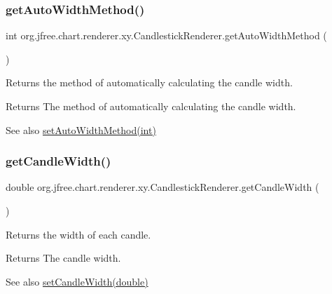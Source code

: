 \subsubsection{\texorpdfstring{get\+Auto\+Width\+Method()}{getAutoWidthMethod()}}
{\footnotesize\ttfamily int org.\+jfree.\+chart.\+renderer.\+xy.\+Candlestick\+Renderer.\+get\+Auto\+Width\+Method (\begin{DoxyParamCaption}{ }\end{DoxyParamCaption})}

Returns the method of automatically calculating the candle width.

\begin{DoxyReturn}{Returns}
The method of automatically calculating the candle width.
\end{DoxyReturn}
\begin{DoxySeeAlso}{See also}
\mbox{\hyperlink{classorg_1_1jfree_1_1chart_1_1renderer_1_1xy_1_1_candlestick_renderer_a556f4cc791dcf82be3e4e82c6f82dd66}{set\+Auto\+Width\+Method(int)}} 
\end{DoxySeeAlso}
\mbox{\label{classorg_1_1jfree_1_1chart_1_1renderer_1_1xy_1_1_candlestick_renderer_a8e2e6f4753add10d08fb407e21de08cf}} 
\subsubsection{\texorpdfstring{get\+Candle\+Width()}{getCandleWidth()}}
{\footnotesize\ttfamily double org.\+jfree.\+chart.\+renderer.\+xy.\+Candlestick\+Renderer.\+get\+Candle\+Width (\begin{DoxyParamCaption}{ }\end{DoxyParamCaption})}

Returns the width of each candle.

\begin{DoxyReturn}{Returns}
The candle width.
\end{DoxyReturn}
\begin{DoxySeeAlso}{See also}
\mbox{\hyperlink{classorg_1_1jfree_1_1chart_1_1renderer_1_1xy_1_1_candlestick_renderer_a212b98d88bbc173df25fcafd7f983ff3}{set\+Candle\+Width(double)}} 
\end{DoxySeeAlso}
\mbox{\label{classorg_1_1jfree_1_1chart_1_1renderer_1_1xy_1_1_candlestick_renderer_a31e9899cbfb21afd7c8277102e681f6f}} 
